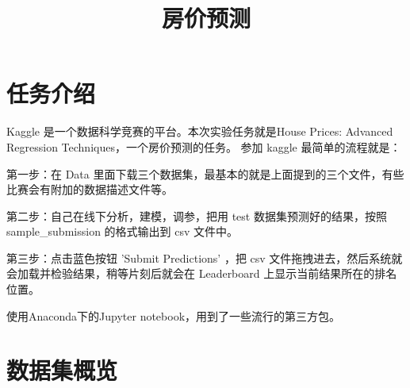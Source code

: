 \documentclass[no-math]{YangThesis}
\title{房价预测}
\begin{document}
	
\maketitle

\setcounter{page}{1}

\vspace{-1.3cm}

\tableofcontents


\clearpage
\vspace{-1cm}
\section{任务介绍}
	

\setcounter{page}{1}

Kaggle 是一个数据科学竞赛的平台。本次实验任务就是House Prices: Advanced Regression Techniques，一个房价预测的任务。
参加 kaggle 最简单的流程就是：

第一步：在 Data 里面下载三个数据集，最基本的就是上面提到的三个文件，有些比赛会有附加的数据描述文件等。

第二步：自己在线下分析，建模，调参，把用 test 数据集预测好的结果，按照 sample\_submission 的格式输出到 csv 文件中。

第三步：点击蓝色按钮 ’Submit Predictions’ ，把 csv 文件拖拽进去，然后系统就会加载并检验结果，稍等片刻后就会在 Leaderboard 上显示当前结果所在的排名位置。

使用Anaconda下的Jupyter notebook，用到了一些流行的第三方包。 


 \hypertarget{ux6570ux636eux96c6ux6982ux89c8}{%
	\section{数据集概览}\label{ux6570ux636eux96c6ux6982ux89c8}}
\end{document}
